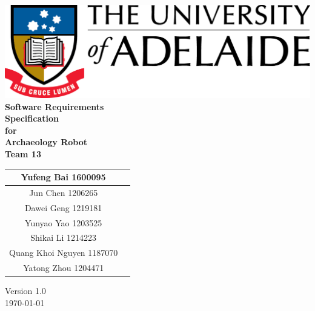 \begin{center}
\includegraphics[scale=1.5]{UniLogo}\\[1cm]    
\textbf{\Huge \bfseries Software Requirements \\Specification}\\[1.5cm]
\textbf{\huge for}\\[0.5cm]


\textbf{ \huge Archaeology Robot }\\[0.3cm]
\textbf{ \huge Team 13 }\\[2cm]


\begin{tabular}{ |c | p{2cm} |}
	\hline
Yufeng Bai 1600095 & \\[.5cm] \hline
Jun Chen 1206265 & \\[.5cm] \hline
Dawei Geng 1219181 & \\[.5cm] \hline
Yunyao Yao 1203525 & \\[.5cm] \hline
Shikai Li 1214223 & \\[.5cm] \hline
Quang Khoi Nguyen 1187070  & \\[.5cm] \hline
Yatong Zhou 1204471 & \\[.5cm] \hline
\end{tabular}


\vfill

Version 1.0 \\ [0.2cm]
{\large \today}

\end{center}

